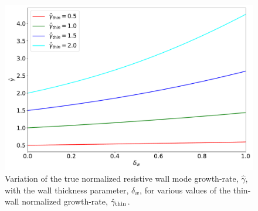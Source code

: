 \documentclass[12pt,prb,aps]{revtex4-1}
\begin{document}
\newpage
\begin{figure}
\centerline{\includegraphics[width=\textwidth]{Fig8.pdf}}
\caption{Variation of the true  normalized resistive wall  mode growth-rate, $\hat{\gamma}$,  with the wall thickness parameter, $\delta_w$, for various values of the thin-wall normalized growth-rate, $\hat{\gamma}_{\rm thin}$.  \label{fig10}}
\end{figure}
\end{document}
